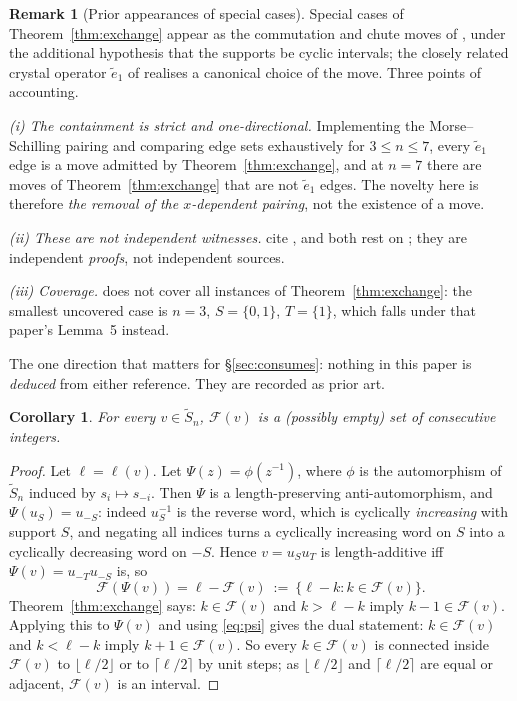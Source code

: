 \documentclass[11pt]{article}
\newtheorem{cor}[thm]{Corollary}
\theoremstyle{definition}
\newtheorem{rem}[thm]{Remark}
\newcommand{\Saff}{\widetilde{S}_{n}}
\begin{document}
\begin{rem}[Prior appearances of special cases]\label{rem:prior}
Special cases of Theorem~\ref{thm:exchange} appear as the commutation and chute moves of
\cite[Lem.~23]{Denton}, under the additional hypothesis that the supports be cyclic
intervals; the closely related crystal operator $\tilde e_1$ of
\cite[Def.~3.2, Lem.~3.8]{MorseSchilling} realises a canonical choice of the move. Three
points of accounting.

\emph{(i) The containment is strict and one-directional.} Implementing the Morse--Schilling
pairing and comparing edge sets exhaustively for $3\le n\le 7$, every $\tilde e_1$ edge is a
move admitted by Theorem~\ref{thm:exchange}, and at $n=7$ there are moves of
Theorem~\ref{thm:exchange} that are not $\tilde e_1$ edges. The novelty here is therefore
\emph{the removal of the $x$-dependent pairing}, not the existence of a move.

\emph{(ii) These are not independent witnesses.} \cite{MorseSchilling} cite \cite{Denton},
and both rest on \cite{Lam2006}; they are independent \emph{proofs}, not independent sources.

\emph{(iii) Coverage.} \cite[Lem.~23]{Denton} does not cover all instances of
Theorem~\ref{thm:exchange}: the smallest uncovered case is $n=3$, $S=\{0,1\}$, $T=\{1\}$,
which falls under that paper's Lemma~5 instead.

The one direction that matters for \S\ref{sec:consumes}: nothing in this paper is
\emph{deduced} from either reference. They are recorded as prior art.
\end{rem}

\begin{cor}\label{cor:interval}
For every $v\in\Saff$, $\mathcal F(v)$ is a (possibly empty) set of consecutive integers.
\end{cor}

\begin{proof}
Let $\ell=\ell(v)$. Let $\Psi(z)=\phi(z^{-1})$, where $\phi$ is the automorphism of $\Saff$
induced by $s_i\mapsto s_{-i}$. Then $\Psi$ is a length-preserving anti-automorphism, and
$\Psi(u_S)=u_{-S}$: indeed $u_S^{-1}$ is the reverse word, which is cyclically \emph{increasing}
with support $S$, and negating all indices turns a cyclically increasing word on $S$ into a
cyclically decreasing word on $-S$. Hence $v=u_Su_T$ is length-additive iff
$\Psi(v)=u_{-T}u_{-S}$ is, so
\begin{equation}\label{eq:psi}
  \mathcal F(\Psi(v))=\ell-\mathcal F(v)\ :=\ \{\ell-k:k\in\mathcal F(v)\}.
\end{equation}
Theorem~\ref{thm:exchange} says: $k\in\mathcal F(v)$ and $k>\ell-k$ imply
$k-1\in\mathcal F(v)$. Applying this to $\Psi(v)$ and using \eqref{eq:psi} gives the dual
statement: $k\in\mathcal F(v)$ and $k<\ell-k$ imply $k+1\in\mathcal F(v)$.
So every $k\in\mathcal F(v)$ is connected inside $\mathcal F(v)$ to $\lfloor \ell/2\rfloor$ or
to $\lceil \ell/2\rceil$ by unit steps; as $\lfloor\ell/2\rfloor$ and $\lceil\ell/2\rceil$ are
equal or adjacent, $\mathcal F(v)$ is an interval.
\end{proof}
\end{document}
